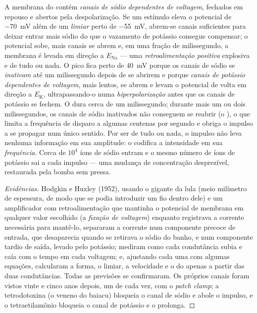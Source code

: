 \begin{proposition}[O impulso]\label{prop:b2:neurons-synapses:ap}
A membrana do  contém \emph{canais de sódio dependentes de
voltagem}, fechados em repouso e abertos pela despolarização. Se um
estímulo eleva o potencial de \qty{-70}{mV} além de um \emph{limiar}
perto de \qty{-55}{mV}, abrem-se canais suficientes para deixar entrar
mais sódio do que o vazamento de potássio consegue compensar; o
potencial sobe, mais canais se abrem e, em uma fração de milissegundo,
a membrana é levada em direção a $E_{\mathrm{Na}}$ --- uma
\emph{retroalimentação positiva} explosiva e de tudo ou nada. O pico
fica perto de \qty{+40}{mV} porque os canais de sódio se
\emph{inativam} até um milissegundo depois de se abrirem e porque
\emph{canais de potássio dependentes de voltagem}, mais lentos, se abrem
e levam o potencial de volta em direção a $E_{\mathrm K}$,
ultrapassando-o numa \emph{hiperpolarização} antes que os canais de
potássio se fechem. O \emph{} dura cerca de um
milissegundo; durante mais um ou dois milissegundos, os canais de sódio
inativados não conseguem se reabrir (o \emph{}), o que
limita a frequência de disparo a algumas centenas por segundo e obriga o
impulso a se propagar num único sentido. Por ser de tudo ou nada, o
impulso não leva nenhuma informação em sua amplitude: o 
codifica a intensidade em sua \emph{frequência}. Cerca de $10^{4}$ íons
de sódio entram e o mesmo número de íons de potássio sai a cada impulso
--- uma mudança de concentração desprezível, restaurada pela bomba sem
pressa.
\end{proposition}
\begin{proof}[Evidências]
Hodgkin e Huxley (1952), usando o  gigante da lula (meio
milímetro de espessura, de modo que se podia introduzir um fio dentro
dele) e um amplificador com retroalimentação que mantinha o potencial
de membrana em qualquer valor escolhido (a \emph{fixação de voltagem})
enquanto registrava a corrente necessária para mantê-lo, separaram a
corrente num componente precoce de entrada, que desaparecia quando se
retirava o sódio do banho, e num componente tardio de saída, levado
pelo potássio; mediram como cada condutância subia e caía com o tempo
em cada voltagem; e, ajustando cada uma com algumas equações,
calcularam a forma, o limiar, a velocidade e o  do
 apenas a partir das duas condutâncias. Todas as
previsões se confirmaram. Os próprios canais foram vistos vinte e cinco
anos depois, um de cada vez, com o \textit{patch clamp}; a tetrodotoxina
(o veneno do baiacu) bloqueia o canal de sódio e abole o impulso, e o
tetraetilamônio bloqueia o canal de potássio e o prolonga.
\end{proof}

